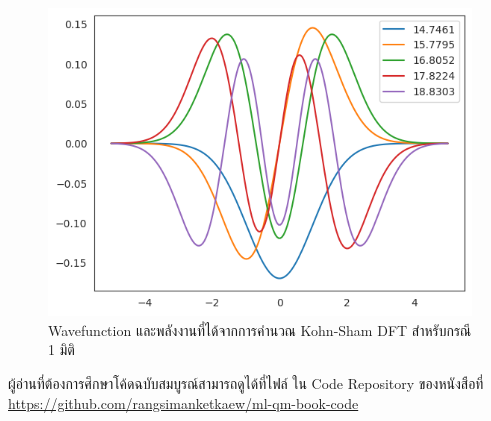 \begin{figure}[htbp]
    \centering
    \includegraphics[width=0.9\linewidth]{fig/ks_dft_1d_wfn_ener.png}
    \caption{Wavefunction และพลังงานที่ได้จากการคำนวณ Kohn-Sham DFT สำหรับกรณี 1 มิติ}
    \label{fig:ks_dft_1d_wfn_ener}
\end{figure}

ผู้อ่านที่ต้องการศึกษาโค้ดฉบับสมบูรณ์สามารถดูได้ที่ไฟล์  ใน Code Repository ของหนังสือที่ 
\url{https://github.com/rangsimanketkaew/ml-qm-book-code}
